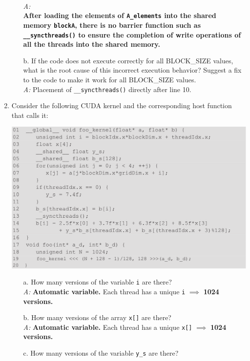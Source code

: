 \begin{enumerate}
\begin{itemize}
                    \\ \textsl{A: }
                    \\\textbf{ After loading the elements of \texttt{A\_elements} into the shared memory \texttt{blockA}, there is no barrier function such as \texttt{\_\_syncthreads()} to ensure the completion of write operations of all the threads into the shared memory.}
              \item[b.] If the code does not execute correctly for all BLOCK\_SIZE values, what is the root cause of this incorrect execution behavior? Suggest a fix to the code to make it work for all BLOCK\_SIZE values.
                    \\\textsl{A:} Placement of \texttt{\_\_syncthreads()} directly after line 10.
          \end{itemize}
    \item Consider the following CUDA kernel and the corresponding host function that calls it:
          \begin{center}
              \includegraphics[width=0.8\linewidth]{Images/Memories/foo_kernel.png}
          \end{center}
          \begin{itemize}
              \item[a.] How many versions of the variable \texttt{i} are there?
                    \\\textsl{A:} \textbf{Automatic variable.} Each thread has a unique \texttt{i} \(\implies\) \textbf{1024 versions.}
              \item[b.] How many versions of the array \texttt{x[]} are there?
                    \\\textsl{A:} \textbf{Automatic variable.} Each thread has a unique \texttt{x[]} \(\implies\) \textbf{1024 versions.}
              \item[c.] How many versions of the variable \texttt{y\_s} are there?

\end{itemize}
\end{enumerate}
